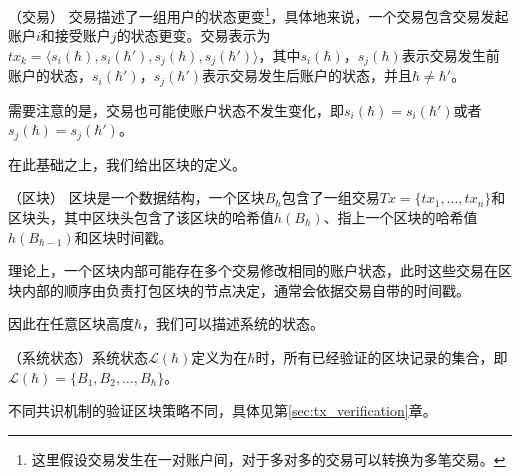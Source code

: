\begin{definition}
（交易） 交易描述了一组用户的状态更变\footnote{这里假设交易发生在一对账户间，对于多对多的交易可以转换为多笔交易。}，具体地来说，一个交易包含交易发起账户$i$和接受账户$j$的状态更变。交易表示为$tx_k=\langle s_i(\hbar),s_i(\hbar'),s_j(\hbar),s_j(\hbar')\rangle$，其中$s_i(\hbar)$，$s_j(\hbar)$表示交易发生前账户的状态，$s_i(\hbar')$，$s_j(\hbar')$表示交易发生后账户的状态，并且$\hbar \neq \hbar'$。
\end{definition}

需要注意的是，交易也可能使账户状态不发生变化，即$s_i(\hbar)=s_i(\hbar')$或者$s_j(\hbar)=s_j(\hbar')$。

在此基础之上，我们给出区块的定义。

\begin{definition}
\label{def:block}
（区块） 区块是一个数据结构，一个区块$B_{\hbar}$包含了一组交易$Tx=\{tx_1,\dots,tx_n\}$和区块头，其中区块头包含了该区块的哈希值$h(B_{\hbar})$、指上一个区块的哈希值$h(B_{\hbar-1})$和区块时间戳。
\end{definition}

理论上，一个区块内部可能存在多个交易修改相同的账户状态，此时这些交易在区块内部的顺序由负责打包区块的节点决定，通常会依据交易自带的时间戳。

因此在任意区块高度$\hbar$，我们可以描述系统的状态。

\begin{definition}
（系统状态）系统状态$\mathcal{L}(\hbar)$定义为在$\hbar$时，所有已经验证的区块记录的集合，即$\mathcal{L}(\hbar)=\{B_1,B_2,\dots,B_{\hbar}\}$。
\end{definition}

不同共识机制的验证区块策略不同，具体见第\ref{sec:tx_verification}章。



